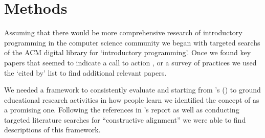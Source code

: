 \documentclass[12pt]{article}
\let\textcite=\autocite
\begin{document}


\section{Methods}
Assuming that there would be more comprehensive research of
introductory programming in the computer science community we began
with targeted searchs of the ACM digital library for `introductory
programming'. Once we found key papers that seemed to indicate a call
to action
\autocite[e.g.][]{mccracken_multinational_2001,kolling_problem_1999},
or a survey of practices
\autocite[e.g.][]{pears_survey_2007-1,robins_learning_2003} we used
the `cited by' list to find additional relevant papers.

We needed a framework to consistently evaluate and starting from
\citeauthor{jamieson_creating_2009}'s
(\citeyear{jamieson_creating_2009}) to ground educational research
activities in how people learn we identified the concept of
 as a promising one. Following the
references in \citeauthor{jamieson_creating_2009}'s report as well as
conducting targeted literature searches for ``constructive alignment''
we were able to find descriptions of this
framework\autocite{jamieson_creating_2009,pellegrino_rethinking_2006,felder_designing_2003,biggs_enhancing_1996}.


\end{document}

